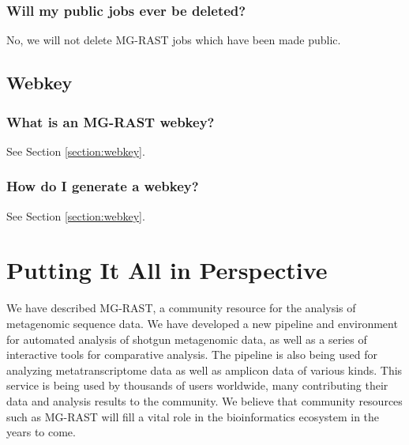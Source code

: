 \documentclass[12pt,fullpage]{report}
\begin{document}
\subsection*{Will my public jobs ever be deleted?}
No, we will not delete MG-RAST jobs which have been made public.
\section{Webkey}
\subsection*{What is an MG-RAST webkey?}
See Section \ref{section:webkey}.
\subsection*{How do I generate a webkey?}
See Section \ref{section:webkey}.
\chapter{Putting It All in Perspective}

We have described MG-RAST, a community resource for the analysis of metagenomic sequence data. We have developed a new pipeline and environment for automated analysis of shotgun metagenomic data, as well as a series of interactive tools for comparative analysis. The pipeline is also being used for analyzing metatranscriptome data as well as amplicon data of various kinds. This service is being used by thousands of users worldwide, many contributing their data and analysis results to the community. We believe that community resources such as MG-RAST will fill a vital role in the bioinformatics ecosystem in the years to come.
\end{document}
